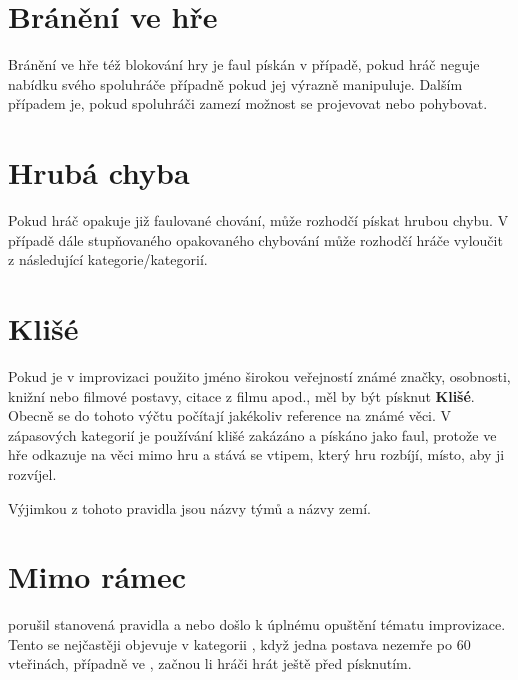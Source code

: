 \documentclass[main.tex]{subfiles}
\begin{document}
\needspace{5cm} \section{Bránění ve hře} \label{bránění ve hře}  
 
Bránění ve hře též blokování hry je faul pískán v případě, pokud hráč neguje nabídku svého spoluhráče případně pokud jej výrazně manipuluje. Dalším případem je, pokud spoluhráči zamezí možnost se projevovat nebo pohybovat. 
 
 
\needspace{5cm} \section{Hrubá chyba} \label{hrubá chyba}  
Pokud hráč opakuje již faulované chování, může rozhodčí pískat hrubou chybu. V případě dále stupňovaného opakovaného chybování může rozhodčí hráče vyloučit z následující kategorie/kategorií. 
 
\needspace{5cm} \section{Klišé} \label{klišé}  
 
Pokud je v improvizaci použito jméno širokou veřejností známé značky, osobnosti, knižní nebo filmové postavy, citace z filmu apod., měl by být písknut  \textbf{Klišé}{}. Obecně se do tohoto výčtu počítají jakékoliv reference na známé věci. V zápasových kategorií je používání klišé zakázáno a pískáno jako faul, protože ve hře odkazuje na věci mimo hru a stává se vtipem, který hru rozbíjí, místo, aby ji rozvíjel. 
  
 
Výjimkou z tohoto pravidla jsou názvy  týmů a názvy zemí. 
 
 
\needspace{5cm} \section{Mimo rámec} \label{mimo rámec}  
 
 porušil stanovená pravidla  a nebo došlo k úplnému opuštění tématu improvizace. Tento  se nejčastěji objevuje v kategorii , když jedna postava nezemře po 60 vteřinách, případně ve , začnou li hráči hrát ještě před písknutím. 
 
\end{document}

